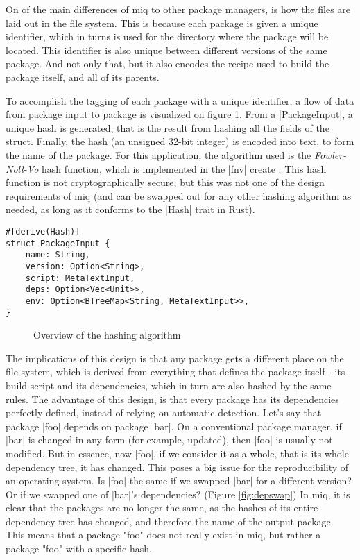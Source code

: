 On of the main differences of miq to other package managers,
is how the files are laid out in the file system. This is
because each package is given a unique identifier, which in
turns is used for the directory where the package will be
located. This identifier is also unique between different
versions of the same package. And not only that, but it also
encodes the recipe used to build the package itself, and all
of its parents.

To accomplish the tagging of each package with a unique
identifier, a flow of data from package input to package is
visualized on figure \ref{fig:hash}. From a |PackageInput|,
a unique hash is generated, that is the result from hashing
all the fields of the struct. Finally, the hash (an unsigned
32-bit integer) is encoded into text, to form the name of
the package. For this application, the algorithm used is the
\textit{Fowler-Noll-Vo} hash function, which is implemented
in the |fnv| create \cite{FnvRust} . This hash function is
not cryptographically secure, but this was not one of the
design requirements of miq (and can be swapped out for any
other hashing algorithm as needed, as long as it conforms to
the |Hash| trait in Rust).



\begin{verbatim}
#[derive(Hash)]
struct PackageInput {
    name: String,
    version: Option<String>,
    script: MetaTextInput,
    deps: Option<Vec<Unit>>,
    env: Option<BTreeMap<String, MetaTextInput>>,
}
\end{verbatim}

\begin{figure}[hbtp]
    \centerfloat
    
    \caption{Overview of the hashing algorithm}
    \label{fig:hash}
\end{figure}

The implications of this design is that any package gets a
different place on the file system, which is derived from
everything that defines the package itself - its build
script and its dependencies, which in turn are also hashed
by the same rules. The advantage of this design, is that
every package has its dependencies perfectly defined,
instead of relying on automatic detection. Let's say that
package |foo| depends on package |bar|. On a conventional
package manager, if |bar| is changed in any form (for
example, updated), then |foo| is usually not modified. But
in essence, now |foo|, if we consider it as a whole, that is
its whole dependency tree, it has changed. This poses a big
issue for the reproducibility of an operating system. Is
|foo| the same if we swapped |bar| for a different version?
Or if we swapped one of |bar|'s dependencies? (Figure
\ref{fig:depswap}) In miq, it is clear that the packages are
no longer the same, as the hashes of its entire dependency
tree has changed, and therefore the name of the output
package. This means that a package "foo" does not really
exist in miq, but rather a package "foo" with a specific hash.

